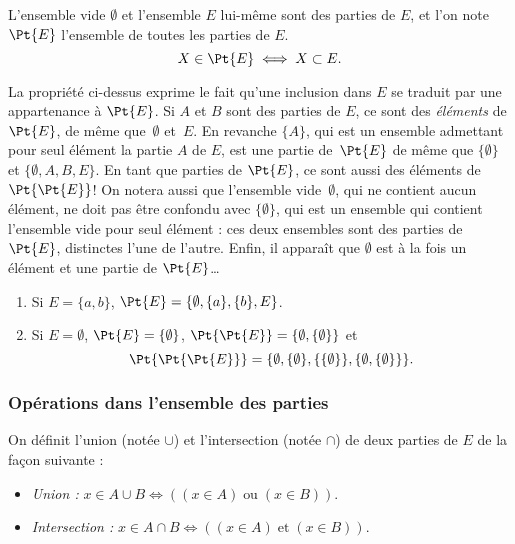 L'ensemble vide $\emptyset$ et l'ensemble $E$ lui-même sont des parties de $E$, et l'on note~$\Pt{E}$ l'ensemble de toutes les parties de $E$.
\[X\in \Pt{E}\iff X\subset E.\]

\begin{alert}
La propriété ci-dessus exprime le fait qu'une inclusion dans $E$ se traduit par une appartenance à $\Pt{E}$. Si $A$ et $B$ sont des parties de $E$, ce sont des \emph{éléments} de $\Pt{E}$, de même que~$\emptyset$ et~$E$. En revanche $\{A\}$, qui est un ensemble admettant pour seul élément la partie $A$ de $E$, est une partie de~$\Pt{E}$ de même que $\{\emptyset\}$ et $\{\emptyset, A, B,E\}$. En tant que parties de $\Pt{E}$, ce sont aussi des éléments de $\Pt{\Pt{E}}$! On notera aussi que l'ensemble vide~$\emptyset$, qui ne contient aucun élément, ne doit pas être confondu avec $\{\emptyset\}$, qui est un ensemble qui contient l'ensemble vide pour seul élément : ces deux ensembles sont des parties de $\Pt{E}$, distinctes l'une de l'autre. Enfin, il apparaît que $\emptyset$ est à la fois un élément et une partie de $\Pt{E}$…
\end{alert}

\begin{example}[Exemples]
\begin{enumerate}
\item Si $E=\{a,b\}$, $\Pt{E}=\{\emptyset,\{a\},\{b\},E\}$.
\item Si $E=\emptyset$, $\Pt{E}=\{\emptyset\}$, $\Pt{\Pt{E}}=\{\emptyset,\{\emptyset\}\}$ et \[\Pt{\Pt{\Pt{E}}}=\{\emptyset,\{\emptyset\},\{\{\emptyset\}\},\{\emptyset,\{\emptyset\}\}\}.\]
\end{enumerate}
\end{example}

\subsubsection{Opérations dans l'ensemble des parties}
On définit l'union (notée $\cup$) et l'intersection (notée $\cap$) de deux parties de $E$ de la façon suivante :

\smallskip\par
\begin{itemize}
\item\textit{Union :} $x\in A\cup B \iff ((x\in A)\;\text{ou}\;(x\in B))$.
\item\textit{Intersection :} $x\in A\cap B \iff ((x\in A)\;\text{et}\;(x\in B))$.
\end{itemize}
\smallskip\par

